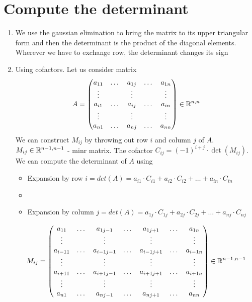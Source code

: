 \section{Compute the determinant}
\begin{enumerate}
\item We use the gaussian elimination to bring the matrix to its upper triangular form and then the determinant is the product of the diagonal elements. Wherever we have to exchange row, the determinant changes its sign
\item Using cofactors. Let us consider matrix
\[
A = \begin{pmatrix}
a_{11} & \dots &a_{1j} & \dots &a_{1n}\\
\vdots & {} & \vdots & {} & \vdots \\
a_{i1} & \dots &a_{ij} & \dots &a_{in}\\
\vdots & {} & \vdots & {} & \vdots \\
a_{n1} & \dots &a_{nj} & \dots &a_{nn}\\
\end{pmatrix} \in\mathbb{R}^{n,n}
\]
We can construct $M_{ij}$ by throwing out row $i$ and column $j$ of $A$. $M_{ij}\in\mathbb{R}^{n-1,n-1}$ - minr matrix. The cofactor $C_{ij} = (-1)^{i+j}\cdot\det(M_{ij})$. We can compute the determinant of $A$ using 
\begin{itemize}
\item Expansion by row $i=det(A)=a_{i1}\cdot C_{i1}+a_{i2}\cdot C_{i2}+\dots+a_{in}\cdot C_{in}$
\item \item Expansion by column $j=det(A)=a_{1j}\cdot C_{1j}+a_{2j}\cdot C_{2j}+\dots+a_{nj}\cdot C_{nj}$
\end{itemize}
\[
M_{ij} = \begin{pmatrix}
a_{11} & \dots & a_{1j-1} & \dots & a_{1j+1} & \dots & a_{1n}\\
\vdots & {} & \vdots & {} & \vdots & {} & \vdots\\
a_{i-11} & \dots & a_{i-1j-1} & \dots & a_{i-1j+1} & \dots & a_{i-1n}\\
\vdots & {} & \vdots & {} & \vdots & {} & \vdots\\
a_{i+11} & \dots & a_{i+1j-1} & \dots & a_{i+1j+1} & \dots & a_{i+1n}\\
\vdots & {} & \vdots & {} & \vdots & {} & \vdots\\
a_{n1} & \dots & a_{nj-1} & \dots & a_{nj+1} & \dots & a_{nn}\\
\end{pmatrix}\in\mathbb{R}^{n-1,n-1}
\]
\end{enumerate}

